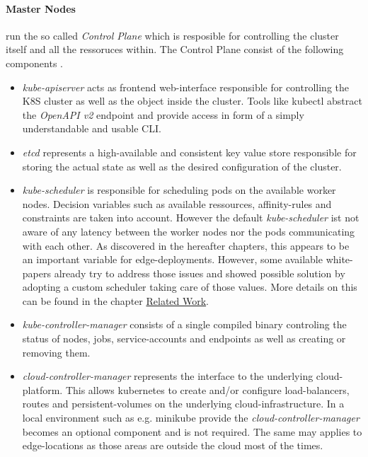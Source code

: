 \documentclass[MSC,Master,english]{twbook}%
\begin{document}
\paragraph{Master Nodes} run the so called \textit{Control Plane} which is resposible for controlling the cluster itself and all the ressoruces within. The Control Plane consist of the following components \cite{k8scomp}.
\begin{itemize}
    \item \textit{kube-apiserver} acts as frontend web-interface responsible for controlling the \ac{K8S} cluster as well as the object inside the cluster. Tools like kubectl abstract the \textit{OpenAPI v2} endpoint and provide access in form of a simply understandable and usable \ac{CLI}. 
    \item \textit{etcd} represents a high-available and consistent key value store responsible for storing the actual state as well as the desired configuration of the cluster.
    \item \textit{kube-scheduler} is responsible for scheduling pods on the available worker nodes. Decision variables such as available ressources, affinity-rules and constraints are taken into account. However the default \textit{kube-scheduler} ist not aware of any latency between the worker nodes nor the pods communicating with each other. As discovered in the hereafter chapters, this appears to be an important variable for edge-deployments. However, some available white-papers already try to address those issues and showed possible solution by adopting a custom scheduler taking care of those values. More details on this can be found in the chapter \hyperref[chap:related]{Related Work}.
    \item \textit{kube-controller-manager} consists of a single compiled binary controling the status of nodes, jobs, service-accounts and endpoints as well as creating or removing them.
    \item \textit{cloud-controller-manager} represents the interface to the underlying cloud-platform. This allows kubernetes to create and/or configure load-balancers, routes and persistent-volumes on the underlying cloud-infrastructure. In a local environment such as e.g. minikube provide the \textit{cloud-controller-manager} becomes an optional component and is not required. The same may applies to edge-locations as those areas are outside the cloud most of the times.
\end{itemize}
\end{document}
